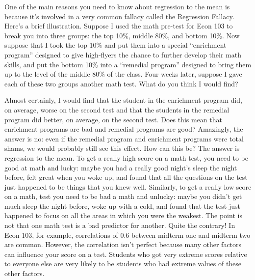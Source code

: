 \documentclass[12pt]{article}
\begin{document}
One of the main reasons you need to know about regression to the mean is because it's involved in a very common fallacy called the Regression Fallacy.
Here's a brief illustration.
Suppose I used the math pre-test for Econ 103 to break you into three groups: the top 10\%, middle 80\%, and bottom 10\%.
Now suppose that I took the top 10\% and put them into a special ``enrichment program'' designed to give high-flyers the chance to further develop their math skills, and put the bottom 10\% into a ``remedial program'' designed to bring them up to the level of the middle 80\% of the class.
Four weeks later, suppose I gave each of these two groups another math test. What do you think I would find?

Almost certainly, I would find that the student in the enrichment program did, on average, worse on the second test and that the students in the remedial program did better, on average, on the second test.
Does this mean that enrichment programs are bad and remedial programs are good?
Amazingly, the answer is no: even if the remedial program and enrichment programs were total shams, we would probably still see this effect.
How can this be?
The answer is regression to the mean.
To get a really high score on a math test, you need to be good at math and lucky: maybe you had a really good night's sleep the night before, felt great when you woke up, and found that all the questions on the test just happened to be things that you knew well.
Similarly, to get a really low score on a math, test you need to be bad a math and unlucky: maybe you didn't get much sleep the night before, woke up with a cold, and found that the test just happened to focus on all the areas in which you were the weakest.
The point is not that one math test is a bad predictor for another.
Quite the contrary!
In Econ 103, for example, correlations of 0.6 between midterm one and midterm two are common.
However, the correlation isn't perfect because many other factors can influence your score on a test.
Students who got very extreme scores relative to everyone else are very likely to be students who had extreme values of these other factors.
\end{document}
